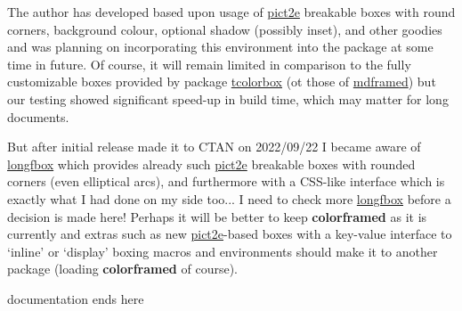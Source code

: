 \documentclass[a4paper,dvipdfmx,10pt,english]{article}
\def\ctanpackage#1{\href{https://ctan.org/pkg/#1}{#1}}
\newcommand\colorframed{%
        \texorpdfstring{{\color{joli}\bfseries colorframed}}{colorframed}\xspace}
\begin{document}
\begin{snugshade}
The author has developed based upon usage of \ctanpackage{pict2e}
breakable boxes with round corners, background colour, optional
shadow (possibly inset), and other goodies and was planning on
incorporating this environment into the package at some time in future.
%
Of course, it will remain limited in comparison to the fully
customizable boxes provided by package \ctanpackage{tcolorbox} (ot
those of \ctanpackage{mdframed}) but our testing showed
significant speed-up in build time, which may matter for long
documents.



  But after initial release made it to CTAN on
  2022/09/22 I became aware of \ctanpackage{longfbox} which
  provides already such \ctanpackage{pict2e} breakable boxes with
  rounded corners (even elliptical arcs), and furthermore with a
  CSS-like interface which is exactly what I had done on my side
  too... I need to check more \ctanpackage{longfbox} before a
  decision is made here!  Perhaps it will be better to keep
  \colorframed as it is currently and
  extras such as new \ctanpackage{pict2e}-based boxes with a key-value
  interface to `inline' or `display' boxing macros and environments
  should make it to another package (loading \colorframed of course).

\end{snugshade}
\centerline{\hrulefill documentation ends here\hrulefill}
\end{document}
